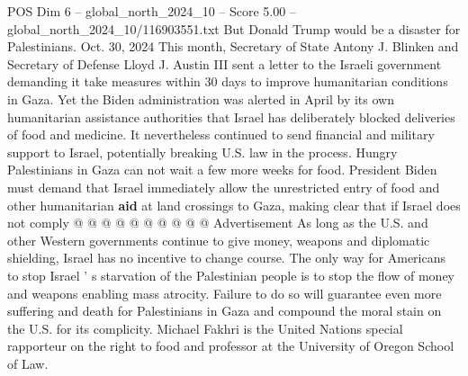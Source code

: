 \begin{textsample}{POS Dim 6 – global\_north\_2024\_10 – Score 5.00 – global\_north\_2024\_10/116903551.txt}
But Donald Trump would be a disaster for Palestinians.
Oct. 30, 2024 This month, Secretary of State Antony J.
Blinken and Secretary of Defense Lloyd J.
Austin III sent a letter to the Israeli government demanding it take measures within 30 days to improve humanitarian conditions in Gaza.
Yet the Biden administration was alerted in April by its own humanitarian assistance authorities that Israel has deliberately blocked deliveries of food and medicine.
It nevertheless continued to send financial and military support to Israel, potentially breaking U.S. law in the process.
Hungry Palestinians in Gaza can not wait a few more weeks for food.
President Biden must demand that Israel immediately allow the unrestricted entry of food and other humanitarian \textbf{aid} at land crossings to Gaza, making clear that if Israel does not comply @ @ @ @ @ @ @ @ @ @ Advertisement As long as the U.S. and other Western governments continue to give money, weapons and diplomatic shielding, Israel has no incentive to change course.
The only way for Americans to stop Israel ' s starvation of the Palestinian people is to stop the flow of money and weapons enabling mass atrocity.
Failure to do so will guarantee even more suffering and death for Palestinians in Gaza and compound the moral stain on the U.S. for its complicity.
Michael Fakhri is the United Nations special rapporteur on the right to food and professor at the University of Oregon School of Law.

\end{textsample}
